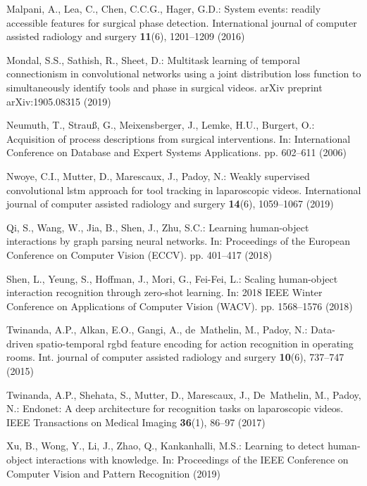 \documentclass[english,runningheads,a4paper]{llncs}
\begin{document}
\begin{thebibliography}{10}
Malpani, A., Lea, C., Chen, C.C.G., Hager, G.D.: System events: readily
  accessible features for surgical phase detection. International journal of
  computer assisted radiology and surgery  \textbf{11}(6),  1201--1209 (2016)

Mondal, S.S., Sathish, R., Sheet, D.: Multitask learning of temporal
  connectionism in convolutional networks using a joint distribution loss
  function to simultaneously identify tools and phase in surgical videos. arXiv
  preprint arXiv:1905.08315  (2019)

Neumuth, T., Strau{\ss}, G., Meixensberger, J., Lemke, H.U., Burgert, O.:
  Acquisition of process descriptions from surgical interventions. In:
  International Conference on Database and Expert Systems Applications. pp.
  602--611 (2006)

Nwoye, C.I., Mutter, D., Marescaux, J., Padoy, N.: Weakly supervised
  convolutional lstm approach for tool tracking in laparoscopic videos.
  International journal of computer assisted radiology and surgery
  \textbf{14}(6),  1059--1067 (2019)

Qi, S., Wang, W., Jia, B., Shen, J., Zhu, S.C.: Learning human-object
  interactions by graph parsing neural networks. In: Proceedings of the
  European Conference on Computer Vision (ECCV). pp. 401--417 (2018)

Shen, L., Yeung, S., Hoffman, J., Mori, G., Fei-Fei, L.: Scaling human-object
  interaction recognition through zero-shot learning. In: 2018 IEEE Winter
  Conference on Applications of Computer Vision (WACV). pp. 1568--1576 (2018)

Twinanda, A.P., Alkan, E.O., Gangi, A., de~Mathelin, M., Padoy, N.: Data-driven
  spatio-temporal rgbd feature encoding for action recognition in operating
  rooms. Int. journal of computer assisted radiology and surgery
  \textbf{10}(6),  737--747 (2015)

Twinanda, A.P., Shehata, S., Mutter, D., Marescaux, J., De~Mathelin, M., Padoy,
  N.: Endonet: A deep architecture for recognition tasks on laparoscopic
  videos. IEEE Transactions on Medical Imaging  \textbf{36}(1),  86--97 (2017)

Xu, B., Wong, Y., Li, J., Zhao, Q., Kankanhalli, M.S.: Learning to detect
  human-object interactions with knowledge. In: Proceedings of the IEEE
  Conference on Computer Vision and Pattern Recognition (2019)


\end{thebibliography}
\end{document}
